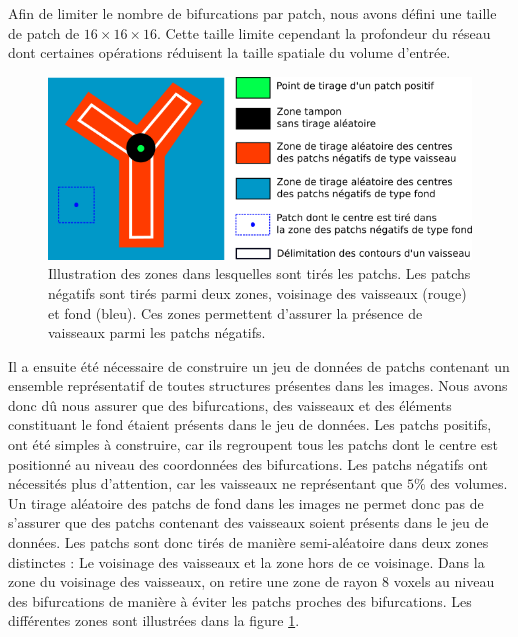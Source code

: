 Afin de limiter le nombre de bifurcations par patch, nous avons défini une taille de patch de $16 \times 16 \times 16$. Cette taille limite cependant la profondeur du réseau dont certaines opérations réduisent la taille spatiale du volume d'entrée.

\begin{figure}[!ht]
    \centering
    \includegraphics[width=\textwidth]{Images/drawing_patch_area.png}
    \caption{Illustration des zones dans lesquelles sont tirés les patchs. Les patchs négatifs sont tirés parmi deux zones, voisinage des vaisseaux (rouge) et fond (bleu). Ces zones permettent d'assurer la présence de vaisseaux parmi les patchs négatifs.}
    \label{fig:drawing_patch_area}
\end{figure}

Il a ensuite été nécessaire de construire un jeu de données de patchs contenant un ensemble représentatif de toutes structures présentes dans les images. Nous avons donc dû nous assurer que des bifurcations, des vaisseaux et des éléments constituant le fond étaient présents dans le jeu de données. Les patchs positifs, ont été simples à construire, car ils regroupent tous les patchs dont le centre est positionné au niveau des coordonnées des bifurcations. Les patchs négatifs ont nécessités plus d'attention, car les vaisseaux ne représentant que $5\percent{}$ des volumes. Un tirage aléatoire des patchs de fond dans les images ne permet donc pas de s'assurer que des patchs contenant des vaisseaux soient présents dans le jeu de données. Les patchs sont donc tirés de manière semi-aléatoire dans deux zones distinctes : Le voisinage des vaisseaux et la zone hors de ce voisinage. Dans la zone du voisinage des vaisseaux, on retire une zone de rayon $8$ voxels au niveau des bifurcations de manière à éviter les patchs proches des bifurcations. Les différentes zones sont illustrées dans la figure \ref{fig:drawing_patch_area}.


